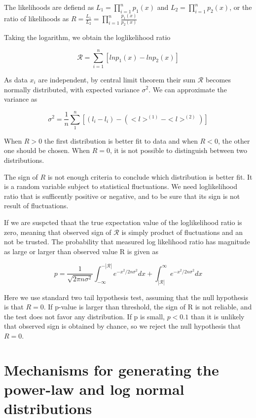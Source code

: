 The likelihoods are defiend as $L_1=\prod_{i=1}^{n}p_1(x)$ and $L_2=\prod_{i=1}^{n}p_2(x)$, or the ratio of likelihoods as $R=\frac{L_1}{L_2} = \prod_{i=1}^{n} \frac{p_1(x)}{p_2(x)}$

Taking the logarithm, we obtain the loglikelihood ratio

\begin{equation}
\mathcal{R} = \sum_{i=1}^{n} \left[ln p_1(x) - ln p_2(x)\right]
\end{equation}

As data $x_i$ are independent, by central limit theorem their sum $\mathcal{R}$ becomes normally distributed, with expected variance $\sigma^2$. We can approximate the variance as 

$$\sigma^2 = \frac{1}{n}\sum_{1}^{n}[(l_i - l_i) - (<l>^{(1)}- <l>^{(2)})]$$

When $R>0$ the first distribution is better fit to data and when $R<0$, the other one should be chosen. When $R=0$, it is not possible to distinguish between two distributions. 

The sign of $R$ is not enough criteria to conclude which distribution is better fit. It is a random variable subject to statistical fluctuations. We need loglikelihood ratio that is sufficently positive or negative, and to be sure that its sign is not result of fluctuations.

If we are suspcted thaat the true expectation value of the loglikelihood ratio is zero, meaning that observed sign of $\mathcal{R}$ is simply product of fluctuations and an not be trusted. The probability that measured log likelihood ratio has magnitude as large or larger than observed value R is given as

\begin{equation}
p = \frac{1}{\sqrt{2\pi n \sigma^2}} \int_{-\infty}^{-|\mathcal{R}|}e^{-x^2/2n\sigma^2}dx + \int_{|\mathcal{R}|}^{\infty}e^{-x^2/2n\sigma^2}dx
\end{equation}

Here we use standard two tail hypothesis test, assuming that the null hypothesis is that $R= 0$. If p-value is larger than threshold, the sign of R is not reliable, and the test does not favor any distribution. If p is small, $p<0.1$ than it is unlikely that observed sign is obtained by chance, so we reject the null hypothesis that $R=0$. 

\section{Mechanisms for generating the power-law and log normal distributions}



